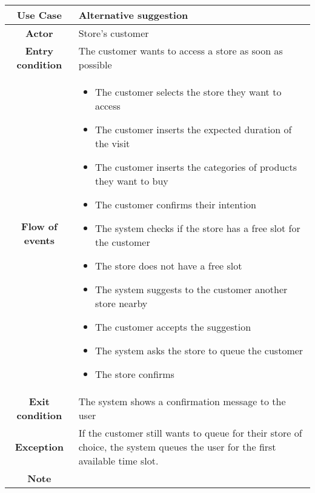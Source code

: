 \documentclass[../../main.tex]{subfiles}
\begin{document}
    \begin{table}[H]
      \centering
        \begin{tabular}{c m{}}
        \hline
        \textbf{Use Case} & Alternative suggestion\\ \hline
        \textbf{Actor} & Store's customer\\ \hline
        \textbf{Entry condition} & The customer wants to access a store as soon as possible\\  \hline
        \textbf{Flow of events} & \begin{itemize}
                                    \item The customer selects the store they want to access
                                    \item The customer inserts the expected duration of the visit
                                    \item The customer inserts the categories of products they want to buy
                                    \item The customer confirms their intention
                                    \item The system checks if the store has a free slot for the customer
                                    \item The store does not have a free slot
                                    \item The system suggests to the customer another store nearby
                                    \item The customer accepts the suggestion
                                    \item The system asks the store to queue the customer
                                    \item The store confirms
                                  \end{itemize}\\ \hline
        \textbf{Exit condition} & The system shows a confirmation message to the user \\ \hline
        \textbf{Exception} & If the customer still wants to queue for their store of choice, the system queues the user for the first available time slot. \\ \hline
        \textbf{Note} &\\ \hline
        \end{tabular}
    \end{table}
\end{document}
